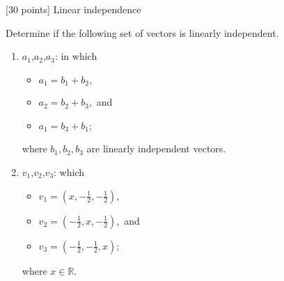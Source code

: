 [30 points] Linear independence\\

\vspace{0.1in}

Determine if the following set of vectors is linearly independent. \\
\begin{enumerate}

\item 
$a_1$,$a_2$,$a_3$: in which
\begin{itemize}
\item $a_1 = b_1+ b_2,$
\item $a_2 = b_2+ b_3,$ and
\item $a_1 = b_3+ b_1$;
\end{itemize}
where $b_1, b_2, b_3$ are linearly independent vectors.

\item 
$v_1$,$v_2$,$v_3$: which
\begin{itemize}
\item $v_{1}=\left(x,-\frac{1}{2},-\frac{1}{2}\right),$
\item $v_{2}=\left(-\frac{1}{2},x,-\frac{1}{2}\right),$ and 
\item $v_{3}=\left(-\frac{1}{2},-\frac{1}{2},x\right)$;
\end{itemize}
where $x\in\mathbb{R}$.
\end{enumerate}

